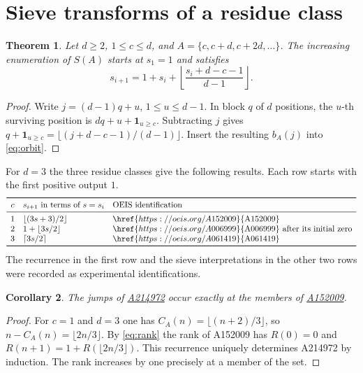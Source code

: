 \documentclass[11pt]{article}
\newtheorem{theorem}{Theorem}
\newtheorem{corollary}[theorem]{Corollary}
\newcommand{\oeis}[1]{\href{https://oeis.org/#1}{\textup{#1}}}
\begin{document}
\section{Sieve transforms of a residue class}
\begin{theorem}\label{thm:residue}
Let $d\ge2$, $1\le c\le d$, and $A=\{c,c+d,c+2d,\ldots\}$. The increasing
enumeration of $S(A)$ starts at $s_1=1$ and satisfies
\begin{equation}
 s_{i+1}=1+s_i+\left\lfloor\frac{s_i+d-c-1}{d-1}\right\rfloor.
 \label{eq:res}
\end{equation}
\end{theorem}
\begin{proof}
Write $j=(d-1)q+u$, $1\le u\le d-1$. In block $q$ of $d$ positions, the
$u$-th surviving position is $dq+u+\mathbf 1_{u\ge c}$. Subtracting $j$
gives $q+\mathbf 1_{u\ge c}=\lfloor(j+d-c-1)/(d-1)\rfloor$.
Insert the resulting $b_A(j)$ into \eqref{eq:orbit}.
\end{proof}
For $d=3$ the three residue classes give the following results. Each row
starts with the first positive output $1$.
\[
\begin{array}{cll}
\toprule
 c & s_{i+1}\text{ in terms of }s=s_i & \text{OEIS identification}\\
\midrule
1 & \lfloor(3s+3)/2\rfloor & \oeis{A152009}\\
2 & 1+\lfloor3s/2\rfloor & \oeis{A006999}\text{ after its initial zero}\\
3 & \lceil3s/2\rceil & \oeis{A061419}\\
\bottomrule
\end{array}
\]
The recurrence in the first row and the sieve interpretations in the
other two rows were recorded as experimental identifications.

\begin{corollary}
The jumps of \oeis{A214972} occur exactly at the members of \oeis{A152009}.
\end{corollary}
\begin{proof}
For $c=1$ and $d=3$ one has
$C_A(n)=\lfloor(n+2)/3\rfloor$, so $n-C_A(n)=\lfloor2n/3\rfloor$.
By \eqref{eq:rank} the rank of A152009 has $R(0)=0$ and
$R(n+1)=1+R(\lfloor2n/3\rfloor)$. This recurrence uniquely determines
A214972 by induction. The rank increases by one precisely at a member
of the set.
\end{proof}
\end{document}
